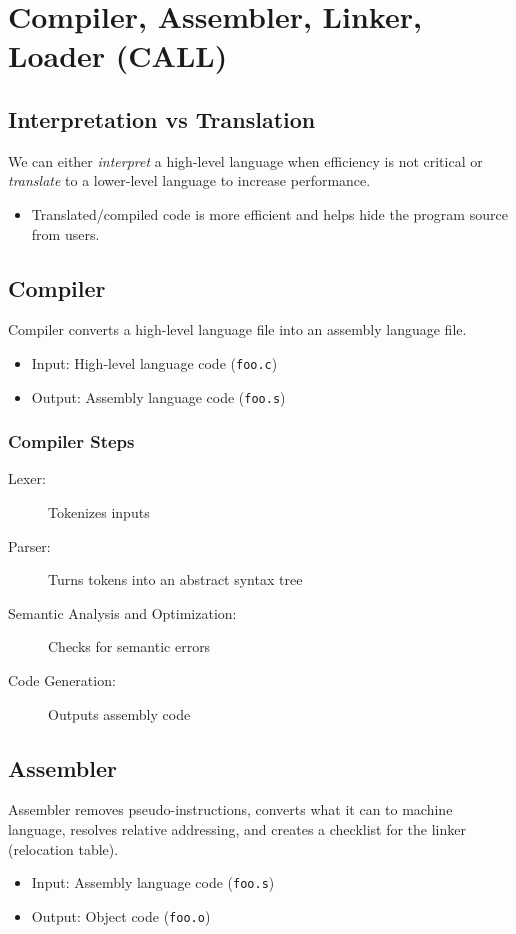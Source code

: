 \chapter{Compiler, Assembler, Linker, Loader (CALL)}

\section{Interpretation vs Translation}
We can either \emph{interpret} a high-level language when efficiency is not critical or \emph{translate} to a lower-level language to increase performance.
\begin{itemize}
    \item Translated/compiled code is more efficient and helps hide the program source from users.
\end{itemize}

\section{Compiler}
Compiler converts a high-level language file into an assembly language file.
\begin{itemize}
    \item Input: High-level language code (\texttt{foo.c})
    \item Output: Assembly language code (\texttt{foo.s})
\end{itemize}

\subsection{Compiler Steps}
\begin{description}
    \item[Lexer:] Tokenizes inputs
    \item[Parser:] Turns tokens into an abstract syntax tree
    \item[Semantic Analysis and Optimization:] Checks for semantic errors
    \item[Code Generation:] Outputs assembly code
\end{description}

\section{Assembler}
Assembler removes pseudo-instructions, converts what it can to machine language, resolves relative addressing, and creates a checklist for the linker (relocation table).
\begin{itemize}
    \item Input: Assembly language code (\texttt{foo.s})
    \item Output: Object code (\texttt{foo.o})
\end{itemize}

